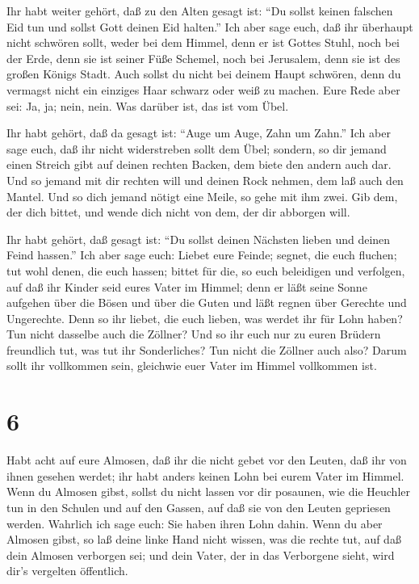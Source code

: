  Ihr habt weiter gehört, daß zu den Alten gesagt ist: ``Du
sollst keinen falschen Eid tun und sollst Gott deinen Eid halten.''
 Ich aber sage euch, daß ihr überhaupt nicht schwören
sollt, weder bei dem Himmel, denn er ist Gottes Stuhl, 
noch bei der Erde, denn sie ist seiner Füße Schemel, noch bei Jerusalem,
denn sie ist des großen Königs Stadt.  Auch sollst du nicht
bei deinem Haupt schwören, denn du vermagst nicht ein einziges Haar
schwarz oder weiß zu machen.  Eure Rede aber sei: Ja, ja;
nein, nein. Was darüber ist, das ist vom Übel.

 Ihr habt gehört, daß da gesagt ist: ``Auge um Auge, Zahn
um Zahn.''  Ich aber sage euch, daß ihr nicht widerstreben
sollt dem Übel; sondern, so dir jemand einen Streich gibt auf deinen
rechten Backen, dem biete den andern auch dar.  Und so
jemand mit dir rechten will und deinen Rock nehmen, dem laß auch den
Mantel.  Und so dich jemand nötigt eine Meile, so gehe mit
ihm zwei.  Gib dem, der dich bittet, und wende dich nicht
von dem, der dir abborgen will.

 Ihr habt gehört, daß gesagt ist: ``Du sollst deinen
Nächsten lieben und deinen Feind hassen.''  Ich aber sage
euch: Liebet eure Feinde; segnet, die euch fluchen; tut wohl denen, die
euch hassen; bittet für die, so euch beleidigen und verfolgen,
 auf daß ihr Kinder seid eures Vater im Himmel; denn er
läßt seine Sonne aufgehen über die Bösen und über die Guten und läßt
regnen über Gerechte und Ungerechte.  Denn so ihr liebet,
die euch lieben, was werdet ihr für Lohn haben? Tun nicht dasselbe auch
die Zöllner?  Und so ihr euch nur zu euren Brüdern
freundlich tut, was tut ihr Sonderliches? Tun nicht die Zöllner auch
also?  Darum sollt ihr vollkommen sein, gleichwie euer
Vater im Himmel vollkommen ist.

\hypertarget{section-5}{%
\section{6}\label{section-5}}

 Habt acht auf eure Almosen, daß ihr die nicht gebet vor den
Leuten, daß ihr von ihnen gesehen werdet; ihr habt anders keinen Lohn
bei eurem Vater im Himmel.  Wenn du Almosen gibst, sollst du
nicht lassen vor dir posaunen, wie die Heuchler tun in den Schulen und
auf den Gassen, auf daß sie von den Leuten gepriesen werden. Wahrlich
ich sage euch: Sie haben ihren Lohn dahin.  Wenn du aber
Almosen gibst, so laß deine linke Hand nicht wissen, was die rechte tut,
 auf daß dein Almosen verborgen sei; und dein Vater, der in
das Verborgene sieht, wird dir's vergelten öffentlich.

